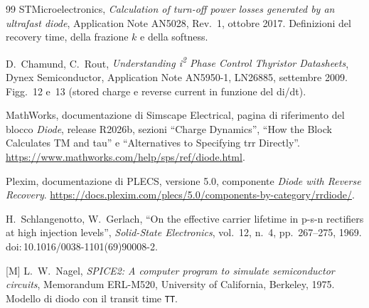 \documentclass[10pt,a4paper]{scrartcl}
\begin{document}
\begin{thebibliography}{99}
STMicroelectronics, \emph{Calculation of turn-off power losses generated by an ultrafast diode}, Application Note AN5028, Rev.~1, ottobre 2017. Definizioni del recovery time, della frazione $k$ e della softness.

D.~Chamund, C.~Rout, \emph{Understanding i\textsuperscript{2} Phase Control Thyristor Datasheets}, Dynex Semiconductor, Application Note AN5950-1, LN26885, settembre 2009. Figg.~12 e~13 (stored charge e reverse current in funzione del di/dt).

MathWorks, documentazione di Simscape Electrical, pagina di riferimento del blocco \emph{Diode}, release R2026b, sezioni ``Charge Dynamics'', ``How the Block Calculates TM and tau'' e ``Alternatives to Specifying trr Directly''. \url{https://www.mathworks.com/help/sps/ref/diode.html}.

Plexim, documentazione di PLECS, versione 5.0, componente \emph{Diode with Reverse Recovery}. \url{https://docs.plexim.com/plecs/5.0/components-by-category/rrdiode/}.

H.~Schlangenotto, W.~Gerlach, ``On the effective carrier lifetime in p-s-n rectifiers at high injection levels'', \emph{Solid-State Electronics}, vol.~12, n.~4, pp.~267--275, 1969. doi:\,10.1016/0038-1101(69)90008-2.

[M] L.~W.~Nagel, \emph{SPICE2: A computer program to simulate semiconductor circuits}, Memorandum ERL-M520, University of California, Berkeley, 1975. Modello di diodo con il transit time \texttt{TT}.

\end{thebibliography}
\end{document}
